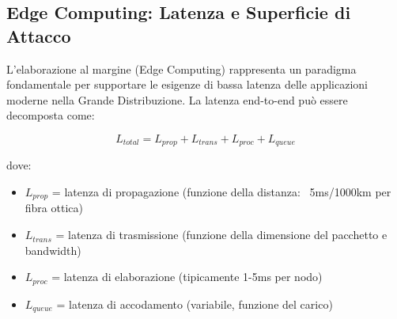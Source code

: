 




\subsection{Edge Computing: Latenza e Superficie di Attacco}

L'elaborazione al margine (Edge Computing) rappresenta un paradigma fondamentale per supportare le esigenze di bassa latenza delle applicazioni moderne nella Grande Distribuzione. La latenza end-to-end può essere decomposta come:

\begin{equation}
L_{total} = L_{prop} + L_{trans} + L_{proc} + L_{queue}
\end{equation}

dove:
\begin{itemize}
    \item $L_{prop}$ = latenza di propagazione (funzione della distanza: ~5ms/1000km per fibra ottica)
    \item $L_{trans}$ = latenza di trasmissione (funzione della dimensione del pacchetto e bandwidth)
    \item $L_{proc}$ = latenza di elaborazione (tipicamente 1-5ms per nodo)
    \item $L_{queue}$ = latenza di accodamento (variabile, funzione del carico)
\end{itemize}


